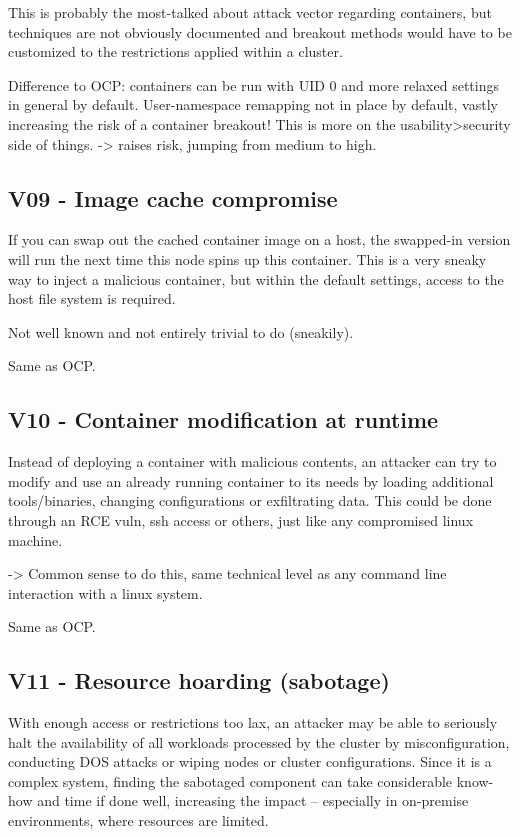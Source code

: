 This is probably the most-talked about attack vector regarding containers, but techniques are not obviously documented and breakout methods would have to be customized to the restrictions applied within a cluster.

Difference to OCP: containers can be run with UID 0 and more relaxed settings in general by default. User-namespace remapping not in place by default, vastly increasing the risk of a container breakout!
This is more on the usability>security side of things. 
-> raises risk, jumping from medium to high.


\subsection{V09 - Image cache compromise}
If you can swap out the cached container image on a host, the swapped-in version will run the next time this node spins up this container.
This is a very sneaky way to inject a malicious container, but within the default settings, access to the host file system is required.

Not well known and not entirely trivial to do (sneakily).

Same as OCP.

\subsection{V10 - Container modification at runtime}
Instead of deploying a container with malicious contents, an attacker can try to modify and use an already running container to its needs by loading additional tools/binaries, changing configurations or exfiltrating data. This could be done through an RCE vuln, ssh access or others, just like any compromised linux machine.

-> Common sense to do this, same technical level as any command line interaction with a linux system.

Same as OCP.

\subsection{V11 - Resource hoarding (sabotage)}
With enough access or restrictions too lax, an attacker may be able to seriously halt the availability of all workloads processed by the cluster by misconfiguration, conducting DOS attacks or wiping nodes or cluster configurations. Since it is a complex system, finding the sabotaged component can take considerable know-how and time if done well, increasing the impact – especially in on-premise environments, where resources are limited.

